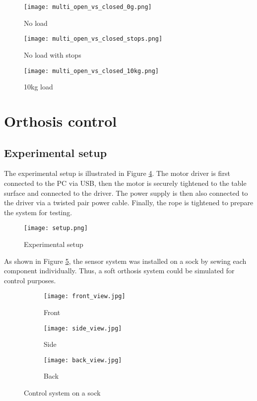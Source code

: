 \begin{figure}[htbp]
  \centering
  \texttt{[image: multi\_open\_vs\_closed\_0g.png]}
  \caption{No load}
  \label{fig:movc0g}
\end{figure}
\begin{figure}[htbp]
  \centering
  \texttt{[image: multi\_open\_vs\_closed\_stops.png]}
  \caption{No load with stops}
  \label{fig:movcstops}
\end{figure}
\begin{figure}[htbp]
  \centering
  \texttt{[image: multi\_open\_vs\_closed\_10kg.png]}
  \caption{10kg load}
  \label{fig:movc10kg}
\end{figure}
\FloatBarrier

\section{Orthosis control}
\subsection{Experimental setup}
The experimental setup is illustrated in Figure \ref{fig:setup}. The motor driver 
is first connected to the PC via USB, then the motor is securely tightened to the 
table surface and connected to the driver. The power supply is then also connected 
to the driver via a twisted pair power cable. Finally, the rope is tightened to 
prepare the system for testing.  

\begin{figure}[htbp]
  \centering
  \texttt{[image: setup.png]}
  \caption{Experimental setup}
  \label{fig:setup}
\end{figure}

As shown in Figure \ref{fig:sensor_system_sock}, the sensor system was installed on a sock by sewing 
each component individually. Thus, a soft orthosis system could be simulated 
for control purposes. 

\begin{figure}[htbp]
    \centering
    \begin{subfigure}{0.3\textwidth}
        \centering
        \texttt{[image: front\_view.jpg]}
        \caption{Front}
    \end{subfigure}
    \begin{subfigure}{0.3\textwidth}
        \centering
        \texttt{[image: side\_view.jpg]}
        \caption{Side}
    \end{subfigure}
    \begin{subfigure}{0.3\textwidth}
        \centering
        \texttt{[image: back\_view.jpg]}
        \caption{Back}
    \end{subfigure}
    \caption{
      Control system on a sock
    }
    \label{fig:sensor_system_sock}
\end{figure}

